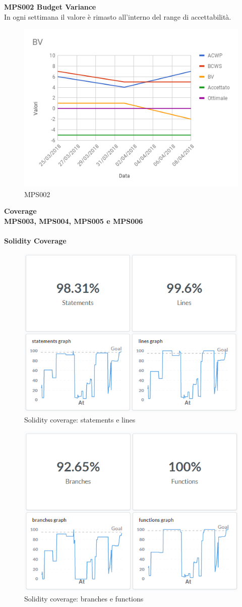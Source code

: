 \documentclass[PianoDiQualifica.tex]{subfiles}
\begin{document}
\textbf{MPS002 Budget Variance}\\
In ogni settimana il valore è rimasto all'interno del range di accettabilità.
\begin{figure}[htb]
	\centering
	\includegraphics[width=0.8\linewidth]{RQ/BV}
	\caption{MPS002}
	\label{fig:processi}
\end{figure}
\newpage
\textbf{Coverage}
\\
\textbf{MPS003, MPS004, MPS005 e MPS006}
\\\\
\textbf{Solidity Coverage}
\begin{figure}[htb]
	\centering
	\includegraphics[width=0.8\linewidth]{RQ/SolidityCoverage1}
	\caption{Solidity coverage: statements e lines}
	\label{fig:processi}
\end{figure}
\begin{figure}[htb]
	\centering
	\includegraphics[width=0.7\linewidth]{RQ/SolidityCoverage2}
	\caption{Solidity coverage: branches e functions}
	\label{fig:processi}
\end{figure}
\end{document}
